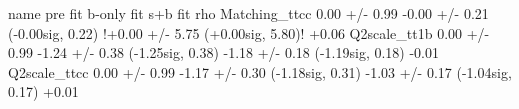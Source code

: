 name                                                 pre fit                        b-only fit                           s+b fit         rho
Matching_ttcc                                  0.00 +/- 0.99    -0.00 +/- 0.21 (-0.00sig, 0.22)    !+0.00 +/- 5.75 (+0.00sig, 5.80)!       +0.06
Q2scale_tt1b                                   0.00 +/- 0.99    -1.24 +/- 0.38 (-1.25sig, 0.38)    -1.18 +/- 0.18 (-1.19sig, 0.18)       -0.01
Q2scale_ttcc                                   0.00 +/- 0.99    -1.17 +/- 0.30 (-1.18sig, 0.31)    -1.03 +/- 0.17 (-1.04sig, 0.17)       +0.01
